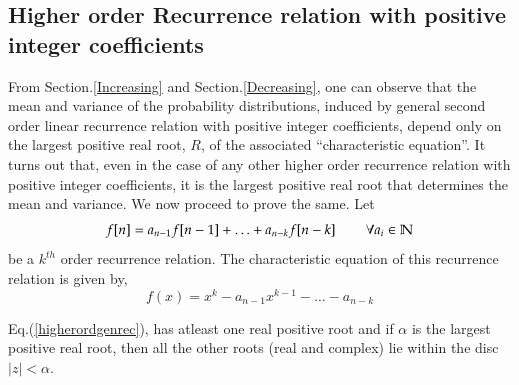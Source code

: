 \begin{multicols}{2}
\section{Higher order Recurrence relation with positive integer coefficients}\label{section-11}
From Section.\ref{Increasing} and Section.\ref{Decreasing}, one can observe that the mean and variance of the probability distributions, induced by general second order linear recurrence relation with positive integer coefficients, depend only on the largest positive real root, $R$, of the associated ``characteristic equation''. It turns out that, even in the case of any other higher order recurrence relation with positive integer coefficients, it is the largest positive real root that determines the mean and variance. We now proceed to prove the same.
Let 
\begin{equation}
 f[n] = a_{n-1}f[n-1] + \ldots + a_{n-k}f[n-k] \hspace{0.3in} \forall a_i \in \mathbb{N}\label{eq-11.1}
\end{equation}
be a $k^{th}$ order recurrence relation. The characteristic equation of this recurrence relation is given by,
 \begin{equation}
    f(x) = x^k - a_{n-1}x^{k-1}- \ldots - a_{n-k}\label{eq-11.2}
 \end{equation}
 \setcounter{thm}{0}
\begin{lem}\label{lemma-1}
Eq.(\ref{higherordgenrec}), has atleast one real positive root and if $\alpha$ is the largest positive real root, then all the other roots (real and complex) lie within the disc $|z| < \alpha$.
\end{lem}


\end{multicols}
